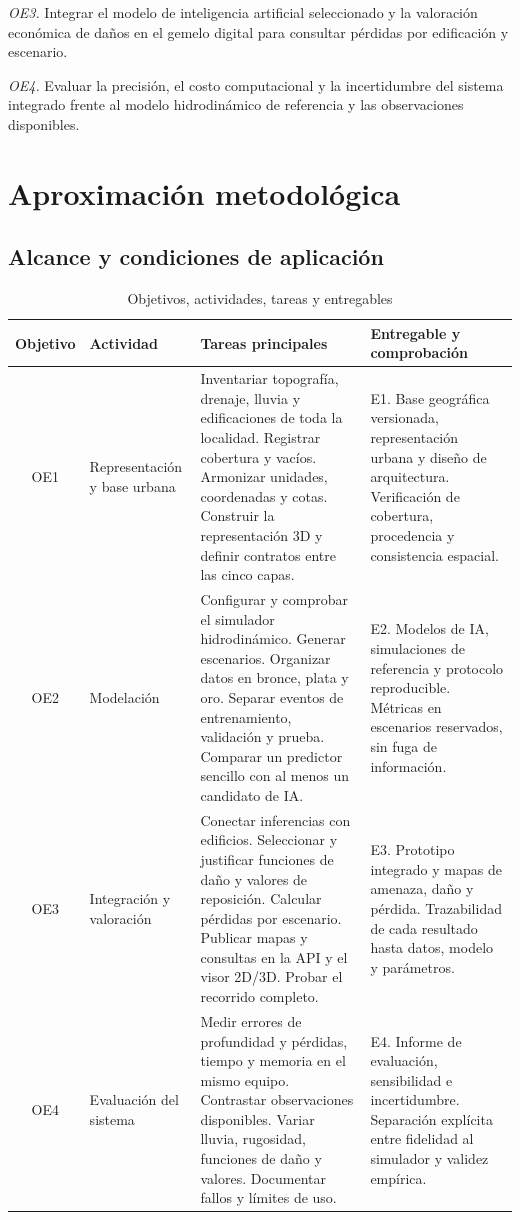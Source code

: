 \documentclass[journal]{IEEEtran}
\begin{document}
\textit{OE3.} Integrar el modelo de inteligencia artificial seleccionado y la valoración económica de daños en el gemelo digital para consultar pérdidas por edificación y escenario.

\textit{OE4.} Evaluar la precisión, el costo computacional y la incertidumbre del sistema integrado frente al modelo hidrodinámico de referencia y las observaciones disponibles.

\section{Aproximación metodológica}

\subsection{Alcance y condiciones de aplicación}

\begin{table}[!t]
\renewcommand{\arraystretch}{1.3}
\caption{Objetivos, actividades, tareas y entregables}
\label{tab:objetivos}
\centering
\begin{tabularx}{\textwidth}{|c|>{\raggedright\arraybackslash}p{2.6cm}|L|L|}
\hline
\textbf{Objetivo} & \textbf{Actividad} & \textbf{Tareas principales} & \textbf{Entregable y comprobación} \\
\hline
OE1 & Representación y base urbana & Inventariar topografía, drenaje, lluvia y edificaciones de toda la localidad. Registrar cobertura y vacíos. Armonizar unidades, coordenadas y cotas. Construir la representación 3D y definir contratos entre las cinco capas. & E1. Base geográfica versionada, representación urbana y diseño de arquitectura. Verificación de cobertura, procedencia y consistencia espacial. \\
\hline
OE2 & Modelación & Configurar y comprobar el simulador hidrodinámico. Generar escenarios. Organizar datos en bronce, plata y oro. Separar eventos de entrenamiento, validación y prueba. Comparar un predictor sencillo con al menos un candidato de IA. & E2. Modelos de IA, simulaciones de referencia y protocolo reproducible. Métricas en escenarios reservados, sin fuga de información. \\
\hline
OE3 & Integración y valoración & Conectar inferencias con edificios. Seleccionar y justificar funciones de daño y valores de reposición. Calcular pérdidas por escenario. Publicar mapas y consultas en la API y el visor 2D/3D. Probar el recorrido completo. & E3. Prototipo integrado y mapas de amenaza, daño y pérdida. Trazabilidad de cada resultado hasta datos, modelo y parámetros. \\
\hline
OE4 & Evaluación del sistema & Medir errores de profundidad y pérdidas, tiempo y memoria en el mismo equipo. Contrastar observaciones disponibles. Variar lluvia, rugosidad, funciones de daño y valores. Documentar fallos y límites de uso. & E4. Informe de evaluación, sensibilidad e incertidumbre. Separación explícita entre fidelidad al simulador y validez empírica. \\
\hline
\end{tabularx}
\end{table}
\end{document}
